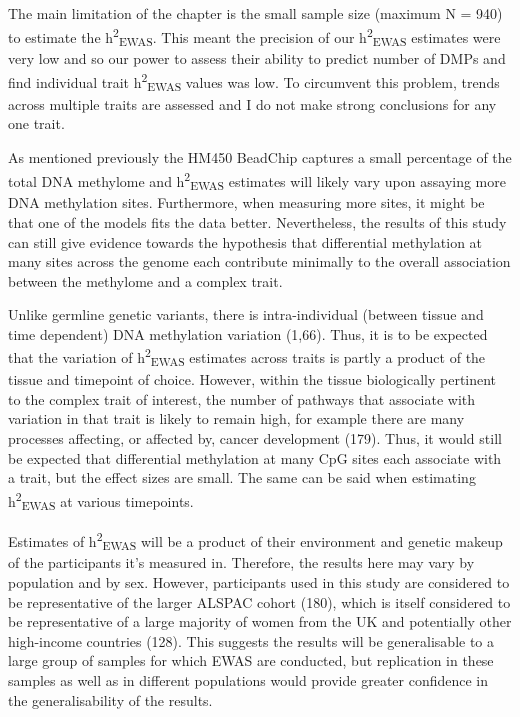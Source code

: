 \documentclass[11pt,oneside]{bristolthesis}
\begin{document}
The main limitation of the chapter is the small sample size (maximum N = 940) to estimate the h\textsuperscript{2}\textsubscript{EWAS}. This meant the precision of our h\textsuperscript{2}\textsubscript{EWAS} estimates were very low and so our power to assess their ability to predict number of DMPs and find individual trait h\textsuperscript{2}\textsubscript{EWAS} values was low. To circumvent this problem, trends across multiple traits are assessed and I do not make strong conclusions for any one trait.

As mentioned previously the HM450 BeadChip captures a small percentage of the total DNA methylome and h\textsuperscript{2}\textsubscript{EWAS} estimates will likely vary upon assaying more DNA methylation sites. Furthermore, when measuring more sites, it might be that one of the models fits the data better. Nevertheless, the results of this study can still give evidence towards the hypothesis that differential methylation at many sites across the genome each contribute minimally to the overall association between the methylome and a complex trait.

Unlike germline genetic variants, there is intra-individual (between tissue and time dependent) DNA methylation variation (1,66). Thus, it is to be expected that the variation of h\textsuperscript{2}\textsubscript{EWAS} estimates across traits is partly a product of the tissue and timepoint of choice. However, within the tissue biologically pertinent to the complex trait of interest, the number of pathways that associate with variation in that trait is likely to remain high, for example there are many processes affecting, or affected by, cancer development (179). Thus, it would still be expected that differential methylation at many CpG sites each associate with a trait, but the effect sizes are small. The same can be said when estimating h\textsuperscript{2}\textsubscript{EWAS} at various timepoints.

Estimates of h\textsuperscript{2}\textsubscript{EWAS} will be a product of their environment and genetic makeup of the participants it's measured in. Therefore, the results here may vary by population and by sex. However, participants used in this study are considered to be representative of the larger ALSPAC cohort (180), which is itself considered to be representative of a large majority of women from the UK and potentially other high-income countries (128). This suggests the results will be generalisable to a large group of samples for which EWAS are conducted, but replication in these samples as well as in different populations would provide greater confidence in the generalisability of the results.
\end{document}
